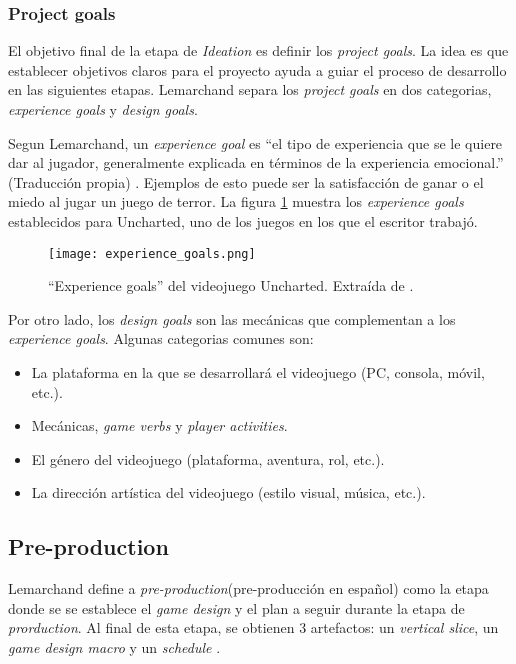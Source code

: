 \subsubsection{Project goals}
\par El objetivo final de la etapa de \textit{Ideation} es definir los \textit{project goals}. La idea es que establecer objetivos claros para el proyecto ayuda a guiar el proceso de desarrollo en las siguientes etapas. Lemarchand separa los \textit{project goals} en dos categorias, \textit{experience goals} y \textit{design goals}. 
\bigbreak
\par Segun Lemarchand, un \textit{experience goal} es ``el tipo de experiencia que se le quiere dar al jugador, generalmente explicada en términos de la experiencia emocional.'' (Traducción propia) \cite{lemarchandPlayfulProductionProcess2021}. Ejemplos de esto puede ser la satisfacción de ganar o el miedo al jugar un juego de terror. La figura \ref{fig:x ejemplo de experience goals Lemarchand} muestra los \textit{experience goals} establecidos para Uncharted, uno de los juegos en los que el escritor trabajó.
%
\begin{figure}[H]
    \centering
    \texttt{[image: experience\_goals.png]}
    \caption{``Experience goals'' del videojuego Uncharted. Extraída de \cite{lemarchandPlayfulProductionProcess2021}.}
    \label{fig:x ejemplo de experience goals Lemarchand}
\end{figure} 
%
\par Por otro lado, los \textit{design goals} son las mecánicas que complementan a los \textit{experience goals}. Algunas categorias comunes son:
\begin{itemize}
    \item La plataforma en la que se desarrollará el videojuego (PC, consola, móvil, etc.).
    \item Mecánicas, \textit{game verbs} y \textit{player activities}.
    \item El género del videojuego (plataforma, aventura, rol, etc.).
    \item La dirección artística del videojuego (estilo visual, música, etc.).
\end{itemize}
%
%
%
\subsection{Pre-production}
\par Lemarchand define a \textit{pre-production}(pre-producción en español) como la etapa donde se se establece el \textit{game design} y el plan a seguir durante la etapa de \textit{prorduction}. Al final de esta etapa, se obtienen 3 artefactos: un \textit{vertical slice}, un \textit{game design macro} y un \textit{schedule} \cite{lemarchandPlayfulProductionProcess2021}.
%
%
